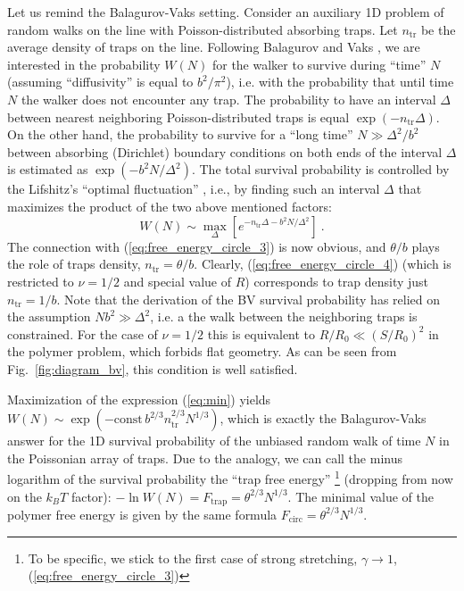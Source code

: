 \documentclass[aps,pre,floatfix,twocolumn,nofootinbib]{revtex4-2}
\newcommand{\be}{\begin{equation}}
\newcommand{\ee}{\end{equation}}
\newcommand{\eq}[1]{(\ref{#1})}
\newcommand{\fig}[1]{Fig.~\ref{#1}}
\begin{document}
Let us remind the Balagurov-Vaks setting. Consider an auxiliary 1D problem of random walks on the line with Poisson-distributed absorbing traps. Let $n_{\mathrm{tr}}$ be the average density of traps on the line. Following Balagurov and Vaks \cite{balagurov}, we are interested in the probability $W(N)$ for the walker to survive during ``time'' $N$ (assuming ``diffusivity'' is equal to $b^2/\pi^2$), i.e. with the probability that until time $N$ the walker does not encounter any trap. The probability to have an interval $\Delta$ between nearest neighboring Poisson-distributed traps is equal $\exp(-n_{\mathrm{tr}}\Delta)$. On the other hand, the probability to survive for a ``long time'' $N \gg \Delta^2/b^2$  between absorbing (Dirichlet) boundary conditions on both ends of the interval $\Delta$ is estimated as $\exp(-b^2 N/\Delta^2)$.  The total survival probability is controlled by the Lifshitz's ``optimal fluctuation'' \cite{Lifshitz_Tails}, i.e., by finding such an interval $\Delta$ that maximizes the product of the two above mentioned factors:
\be
W(N) \sim \max_{\Delta} \left[e^{-n_{\mathrm{tr}} \Delta - b^2 N/\Delta^2}\right] \ .
\label{eq:min}
\ee
The connection with \eq{eq:free_energy_circle_3} is now obvious, and $\theta /b$ plays the role of traps density,  $n_{\mathrm{tr}}=\theta/b$.  Clearly,  \eq{eq:free_energy_circle_4} (which is restricted to $\nu = 1/2$ and special value of $R$) corresponds to trap density just $n_{\mathrm{tr}}=1/b$. Note that the derivation of the BV survival probability has relied on the assumption $Nb^2 \gg \Delta^2$, i.e. a the walk between the neighboring traps is constrained. For the case of $\nu=1/2$ this is equivalent to $R/R_0 \ll (S/R_0)^2$ in the polymer problem, which forbids flat geometry. As can be seen from \fig{fig:diagram_bv}, this condition is well satisfied.

Maximization of the expression \eq{eq:min} yields $W(N) \sim \exp \left(-\mathrm{const} \, b^{2/3} n_{\mathrm{tr}}^{2/3} N^{1/3} \right)$, which is exactly the Balagurov-Vaks answer \cite{balagurov} for the 1D survival probability of the unbiased random walk of time $N$ in the Poissonian array of traps.  Due to the analogy, we can call the minus logarithm of the survival probability the ``trap free energy'' \footnote{To be specific, we stick to the first case of strong stretching, $\gamma \to 1$, \eq{eq:free_energy_circle_3}} (dropping from now on the $k_BT$ factor): $-\ln W(N) = F_{\mathrm{trap}} = \theta^{2/3} N^{1/3}$.  The minimal value of the polymer free energy is given by the same formula  $F_{\mathrm{circ}} = \theta^{2/3}N^{1/3} $.
\end{document}
